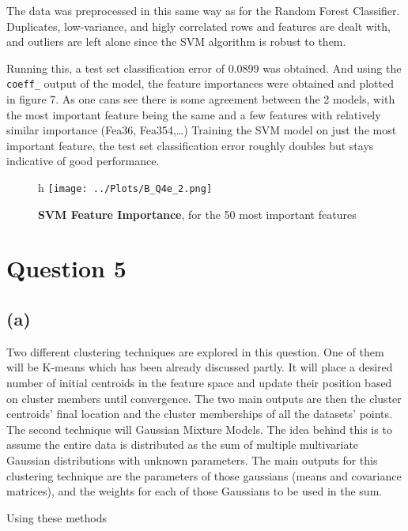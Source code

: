 \documentclass[12pt]{report} %
\begin{document}
The data was preprocessed in this same way as for the Random Forest Classifier. Duplicates, low-variance, and higly correlated rows and features are dealt with, and outliers are left alone since the SVM algorithm is robust to them.  

Running this, a test set classification error of 0.0899 was obtained. And using the \texttt{coeff\_} output of the model, the feature importances were obtained and plotted in figure 7. As one cans see there is some agreement between the 2 models, with the most important feature being the same and a few features with relatively similar importance (Fea36, Fea354,\ldots)  
Training the SVM model on just the most important feature, the test set classification error roughly doubles but stays indicative of good performance.

\begin{figure}{h}
    \centering
    \texttt{[image: ../Plots/B\_Q4e\_2.png]}
    \caption{\textbf{SVM Feature Importance}, for the 50 most important features}
\end{figure}

\newpage

\section*{Question 5}

\subsection*{(a)}

Two different clustering techniques are explored in this question. One of them will be K-means which has been already discussed partly. It will place a desired number of initial centroids in the feature space and update their position based on cluster members until convergence. The two main outputs are then the cluster centroids' final location and the cluster memberships of all the datasets' points.  
The second technique will Gaussian Mixture Models. The idea behind this is to assume the entire data is distributed as the sum of multiple multivariate Gaussian distributions with unknown parameters\cite[p. 260]{sklearn_book}. The main outputs for this clustering technique are the parameters of those gaussians (means and covariance matrices), and the weights for each of those Gaussians to be used in the sum.  

Using these methods






\end{document}
